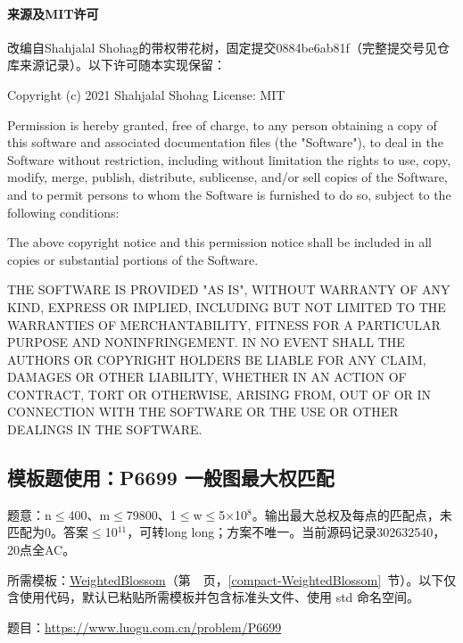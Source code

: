 \paragraph{来源及MIT许可} 改编自Shahjalal Shohag的带权带花树，固定提交0884be6ab81f（完整提交号见仓库来源记录）。以下许可随本实现保留：

Copyright (c) 2021 Shahjalal Shohag
License: MIT

Permission is hereby granted, free of charge, to any person obtaining a copy of this software and associated documentation files (the "Software"), to deal in the Software without restriction, including without limitation the rights to use, copy, modify, merge, publish, distribute, sublicense, and/or sell copies of the Software, and to permit persons to whom the Software is furnished to do so, subject to the following conditions:

The above copyright notice and this permission notice shall be included in all copies or substantial portions of the Software.

THE SOFTWARE IS PROVIDED "AS IS", WITHOUT WARRANTY OF ANY KIND, EXPRESS OR IMPLIED, INCLUDING BUT NOT LIMITED TO THE WARRANTIES OF MERCHANTABILITY, FITNESS FOR A PARTICULAR PURPOSE AND NONINFRINGEMENT. IN NO EVENT SHALL THE AUTHORS OR COPYRIGHT HOLDERS BE LIABLE FOR ANY CLAIM, DAMAGES OR OTHER LIABILITY, WHETHER IN AN ACTION OF CONTRACT, TORT OR OTHERWISE, ARISING FROM, OUT OF OR IN CONNECTION WITH THE SOFTWARE OR THE USE OR OTHER DEALINGS IN THE SOFTWARE.


\newpage

\Needspace{380pt}

\subsection*{模板题使用：P6699 一般图最大权匹配}

\label{usage-example-401}

题意：n$\le$400、m$\le$79800、1$\le$w$\le$5×10$^{8}$。输出最大总权及每点的匹配点，未匹配为0。答案$\le$10$^{11}$，可转long long；方案不唯一。当前源码记录302632540，20点全AC。

所需模板：\hyperref[compact-WeightedBlossom]{WeightedBlossom}（第~\pageref{compact-WeightedBlossom}~页，\ref{compact-WeightedBlossom}~节）。以下仅含使用代码，默认已粘贴所需模板并包含标准头文件、使用 std 命名空间。

题目：\url{https://www.luogu.com.cn/problem/P6699}




